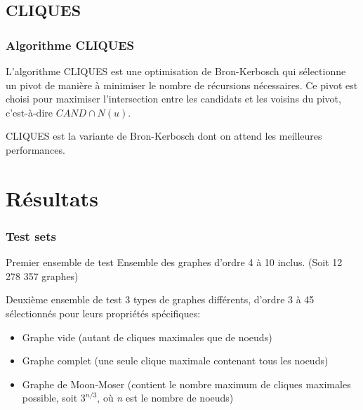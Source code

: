 \documentclass{beamer}
\begin{document}
\subsection{CLIQUES}
\begin{frame}
\frametitle{Algorithme CLIQUES}
L'algorithme CLIQUES est une optimisation de Bron-Kerbosch qui sélectionne un pivot de manière à minimiser le nombre de récursions nécessaires. Ce pivot est choisi pour maximiser l'intersection entre les candidats et les voisins du pivot, c'est-à-dire \(CAND \cap N(u)\).

CLIQUES est la variante de Bron-Kerbosch dont on attend les meilleures performances.
\end{frame}

\section{Résultats}
\begin{frame}
  \frametitle{Test sets}
  \begin{block}{Premier ensemble de test}
    Ensemble des graphes d'ordre 4 à 10 inclus. (Soit 12 278 357 graphes)
  \end{block}
  \begin{block}{Deuxième ensemble de test}
    3 types de graphes différents, d'ordre 3 à 45 sélectionnés pour leurs propriétés spécifiques:
    \begin{itemize}
      \item Graphe vide (autant de cliques maximales que de noeuds)
      \item Graphe complet (une seule clique maximale contenant tous les noeuds)
      \item Graphe de Moon-Moser (contient le nombre maximum de cliques maximales possible, soit \(3^{n/3}\), où \emph{n} est le nombre de noeuds)
    \end{itemize}
  \end{block}
\end{frame}
\end{document}
